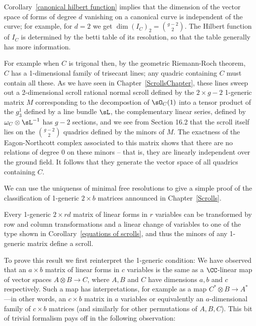 Corollary~\ref{canonical hilbert function} implies that the dimension of the vector space of forms of degree $d$
vanishing on a canonical curve is independent of the curve; for example, for $d=2$ we get
$
\dim ({I_{C}})_{2} = {g-2\choose 2}.
$
The Hilbert function of $I_C$ is determined by the betti table of its resolution, so that the table generally has more information.

 For example
when $C$ is trigonal then, by the geometric Riemann-Roch theorem, $C$ has a 1-dimensional family of trisecant lines; any quadric containing $C$ must contain all these. As we have seen in Chapter~\ref{ScrollsChapter}, these lines sweep
out a 2-dimensional scroll rational normal scroll defined by the $2\times g-2$ 1-generic matrix $M$ corresponding to the decompostion of $\sO_C(1)$
into a tensor product of the $g^{1}_{3}$ defined by a line bundle $\sL$, the complementary linear series,
defined by $\omega_{C}\otimes \sL^{-1}$ has $g-2$ sections, and we see from Section 16.2
that the scroll itself lies on the ${g-2\choose 2}$ quadrics defined by the minors of $M$. The exactness of the Eagon-Northcott complex associated to this matrix shows that there are no relations of degree 0 on these minors -- that is, they are linearly independent over the ground field. It follows that they generate the vector space of all quadrics containing $C$. 


We can use the uniquenss of minimal free resolutions to give a simple proof of the classification of 1-generic $2\times b$
 matrices announced in Chapter~\ref{Scrolls}.
 
\begin{theorem}\label{matrix pencils}
 Every
 1-generic $2 \times rd$ matrix of linear forms in $r$ variables can be transformed by row and column transformations and a linear change
 of variables to one of the type shown in
Corollary~\ref{equations of scrolls}, and thus the minors of any 1-generic matrix define a scroll. 
\end{theorem}


To prove this result we first reinterpret the 1-generic condition:
We have observed that an
$a\times b$ matrix of linear forms in $c$ variables is the same as a $\CC$-linear map of vector spaces
$A \otimes B \to C$, where $A, B$ and $C$ have dimensions $a,b$ and $c$ respectively. Such a map
has interpretations, for example as a map $C^{*} \otimes B\to A^{*}$ ---in other words, an $c\times b$ matrix in $a$ variables or equivalently an $a$-dimensional family of $c\times b$ matrices (and similarly for other permutations of $A,B,C$). 
This bit of trivial formalism pays off in the following observation:

